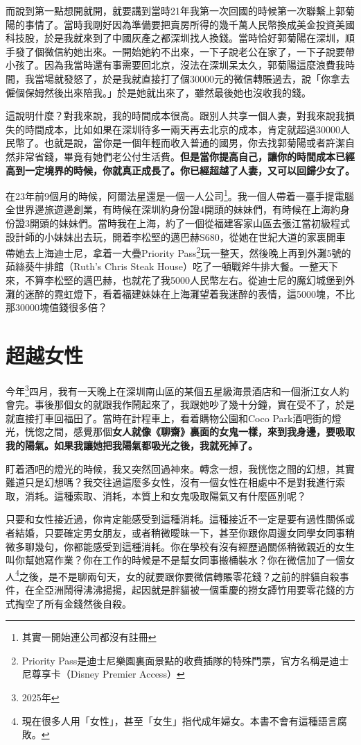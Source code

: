 而說到第一點想開就開，就要講到當時21年我第一次回國的時候第一次聯繫上郭菊陽的事情了。當時我剛好因為準備要把賣房所得的幾千萬人民幣換成美金投資美國科技股，於是我就來到了中國灰產之都深圳找人換錢。當時恰好郭菊陽在深圳，順手發了個微信約她出來。一開始她約不出來，一下子說老公在家了，一下子說要帶小孩了。因為我當時還有事需要回北京，沒法在深圳呆太久，郭菊陽這麼浪費我時間，我當場就發怒了，於是我就直接打了個30000元的微信轉賬過去，說「你拿去僱個保姆然後出來陪我。」於是她就出來了，雖然最後她也沒收我的錢。

這說明什麼？對我來說，我的時間成本很高。跟別人共享一個人妻，對我來說我損失的時間成本，比如如果在深圳待多一兩天再去北京的成本，肯定就超過30000人民幣了。也就是說，當你是一個年輕而收入普通的國男，你去找郭菊陽或者許潔自然非常省錢，畢竟有她們老公付生活費。\textbf{但是當你提高自己，讓你的時間成本已經高到一定境界的時候，你就真正成長了。你已經超越了人妻，又可以回歸少女了。}

在23年前9個月的時候，阿爾法星還是一個一人公司\footnote{其實一開始連公司都沒有註冊}。我一個人帶着一臺手提電腦全世界邊旅遊邊創業，有時候在深圳約身份證4開頭的妹妹們，有時候在上海約身份證3開頭的妹妹們。當時我在上海，約了一個從福建客家山區去張江當初級程式設計師的小妹妹出去玩，開着李松堅的邁巴赫S680，從她在世紀大道的家裏開車帶她去上海迪士尼，拿着一大疊Priority Pass\footnote{Priority Pass是迪士尼樂園裏面景點的收費插隊的特殊門票，官方名稱是迪士尼尊享卡（Disney Premier Access）}玩一整天，然後晚上再到外灘5號的茹絲葵牛排館（Ruth's Chris Steak House）吃了一頓戰斧牛排大餐。一整天下來，不算李松堅的邁巴赫，也就花了我5000人民幣左右。從迪士尼的魔幻城堡到外灘的迷醉的霓虹燈下，看着福建妹妹在上海灘望着我迷醉的表情，這5000塊，不比那30000塊值錢很多倍？

\section{超越女性}

今年\footnote{2025年}四月，我有一天晚上在深圳南山區的某個五星級海景酒店和一個浙江女人約會完。事後那個女的就跟我作鬧起來了，我跟她吵了幾十分鐘，實在受不了，於是就直接打車回福田了。當時在計程車上，看着購物公園和Coco Park酒吧街的燈光，恍惚之間，感覺那個\textbf{女人就像《聊齋》裏面的女鬼一樣，來到我身邊，要吸取我的陽氣。如果我讓她把我陽氣都吸光之後，我就死掉了。}

盯着酒吧的燈光的時候，我又突然回過神來。轉念一想，我恍惚之間的幻想，其實難道只是幻想嗎？我交往過這麼多女性，沒有一個女性在相處中不是對我進行索取，消耗。這種索取、消耗，本質上和女鬼吸取陽氣又有什麼區別呢？

只要和女性接近過，你肯定能感受到這種消耗。這種接近不一定是要有過性關係或者結婚，只要確定男女朋友，或者稍微曖昧一下，甚至你跟你周邊女同學女同事稍微多聊幾句，你都能感受到這種消耗。你在學校有沒有經歷過關係稍微親近的女生叫你幫她寫作業？你在工作的時候是不是幫女同事搬桶裝水？你在微信加了一個女人\footnote{現在很多人用「女性」，甚至「女生」指代成年婦女。本書不會有這種語言腐敗。}之後，是不是聊兩句天，女的就要跟你要微信轉賬零花錢？之前的胖貓自殺事件，在全亞洲鬧得沸沸揚揚，起因就是胖貓被一個重慶的撈女譚竹用要零花錢的方式掏空了所有金錢然後自殺。

